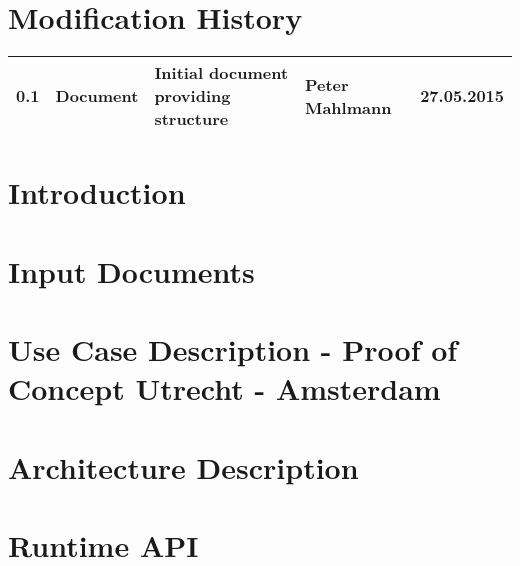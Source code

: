 \documentclass{template/openetcs_report}
\begin{document}


\chapter*{Modification History}
\begin{supertabular}{| m{1.2cm} | m{1.5cm} | m{4.0cm} | m{3.5cm} | m{3.5cm} |}
0.1 & Document & Initial document providing structure & Peter Mahlmann& 27.05.2015 \\\hline
\end{supertabular}

\setcounter{tocdepth}{3}


\tableofcontents
\listoffiguresandtables
\newpage




\mainmatter

\chapter{Introduction}


\chapter{Input Documents}


\chapter{Use Case Description - Proof of Concept Utrecht - Amsterdam}


\chapter{Architecture Description}


\chapter{Runtime API}








\printindex
\end{document}
